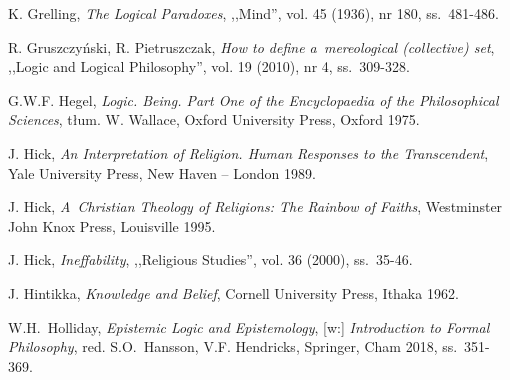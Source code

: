 \begin{thebibliography}{100}
K. Grelling, \textit{The Logical Paradoxes}, ,,Mind'', vol. 45 (1936), nr 180, ss.~481-486.

R. Gruszczyński, R. Pietruszczak, \textit{How to define a~mereological (collective) set}, ,,Logic and Logical Philosophy'', vol. 19 (2010), nr 4, ss.~309-328.



G.W.F. Hegel, \textit{Logic. Being. Part One of the Encyclopaedia of the Philosophical Sciences}, tłum. W. Wallace, Oxford University Press, Oxford 1975.


J. Hick, \textit{An Interpretation of Religion. Human Responses to the Transcendent}, Yale University Press, New Haven -- London 1989.

J. Hick, \textit{A~Christian Theology of Religions: The Rainbow of Faiths}, Westminster John Knox Press, Louisville 1995.

J. Hick, \textit{Ineffability}, ,,Religious Studies'', vol. 36 (2000), ss.~35-46.

J. Hintikka, \textit{Knowledge and Belief}, Cornell University Press, Ithaka 1962.

W.H.~Holliday, \textit{Epistemic Logic and Epistemology}, [w:] \textit{Introduction to Formal Philosophy}, red. S.O.~Hansson, V.F. Hendricks, Springer, Cham 2018, ss.~351-369.


\end{thebibliography}
